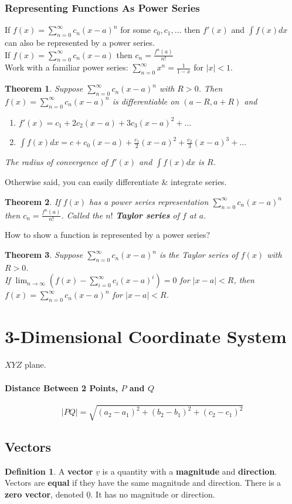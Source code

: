 \documentclass[12 pt]{article}
\newtheorem{thm}{Theorem}
\theoremstyle{definition}
\newtheorem{defn}{Definition}
\begin{document}
	\subsubsection{Representing Functions As Power Series}
	If $f(x)=\sum_{n=0}^{\infty}c_n(x-a)^n$ for some $c_0,c_1,\ldots$ then $f'(x)$ and $\int f(x) dx$ can also be represented by a power series.
	\\ If $f(x)=\sum_{n=0}^{\infty}c_n(x-a)$ then $c_n=\frac{f^{n}(a)}{n!}$
	\\ Work with a familiar power series: $\sum_{n=0}^{\infty}x^n=\frac{1}{1-x}$ for $|x|<1$.
	\begin{thm}
		Suppose $\sum_{n=0}^{\infty}c_n(x-a)^n$ with $R>0$. Then $f(x)=\sum_{n=0}^{\infty}c_n(x-a)^n$ is differentiable on $(a-R,a+R)$ and 
		\begin{enumerate}[1)]
			\item $f'(x)=c_1+2c_2(x-a)+3c_3(x-a)^2+\ldots$
			\item $\int f(x) dx=c+c_0(x-a)+\frac{c_1}{2}(x-a)^2+\frac{c_2}{3}(x-a)^3+\ldots$
		\end{enumerate}
	The radius of convergence of $f'(x)$ and $\int f(x)dx$ is $R$.
	\end{thm} Otherwise said, you can easily differentiate \& integrate series.
	\begin{thm}
		If $f(x)$ has a power series representation $\sum_{n=0}^{\infty} c_n (x-a)^n$ then $c_n=\frac{f^{n}(a)}{n!}$. Called the $n!$ \textbf{Taylor series} of $f$ at $a$.
	\end{thm}
	How to show a function is represented by a power series?
	\begin{thm}
		Suppose $\sum_{n=0}^{\infty} c_n(x-a)^n$ is the Taylor series of $f(x)$ with $R>0$. \\If $\lim_{n\to \infty} (f(x)-\sum_{i=0}^{\infty}c_i(x-a)^i)=0$ for $|x-a|<R$, then $f(x)=\sum_{n=0}^{\infty}c_n(x-a)^n$ for $|x-a|<R$.
	\end{thm}
	\section{3-Dimensional Coordinate System}
	$XYZ$ plane. 
	\paragraph{Distance Between 2 Points, $P$ and $Q$}
	$$|PQ|=\sqrt{(a_2-a_1)^2+(b_2-b_1)^2+(c_2-c_1)^2}$$
	\subsection{Vectors} \begin{defn}
		A \textbf{vector} $\underline{v}$ is a quantity with a \textbf{magnitude} and \textbf{direction}. Vectors are \textbf{equal} if they have the same magnitude and direction. There is a \textbf{zero vector}, denoted $\underline{0}$. It has no magnitude or direction.
	\end{defn}
\end{document}
